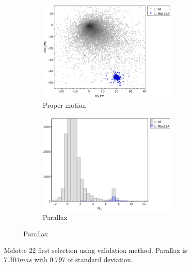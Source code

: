 \documentclass[11pt, a4paper, english]{book}
\begin{document}
\begin{figure}[htbp]
  \centering
  \begin{subfigure}{0.9\textwidth}
    \centering
    \begin{subfigure}[t]{0.45\textwidth}
      \centering
      \includegraphics[width=\textwidth]{../figures/clusterix/topcat_prob_pm_melotte_22.png}
      \caption{Proper motion}
      \label{fig:topcat_prob_pm_melotte_22}
    \end{subfigure}
    \hfill
    \begin{subfigure}[t]{0.45\textwidth}
      \centering
      \includegraphics[width=\textwidth]{../figures/clusterix/topcat_prob_parallax_melotte_22.png}
      \caption{Parallax}
      \label{fig:topcat_prob_parallax_melotte_22}
    \end{subfigure}
  \end{subfigure}
  \caption{Melotte 22 first selection using validation method. Parallax is \(7.304mas\) with 0.797 of standard deviation.}
  \label{fig:topcat_prob_selection_melotte_22}
\end{figure}
\end{document}
